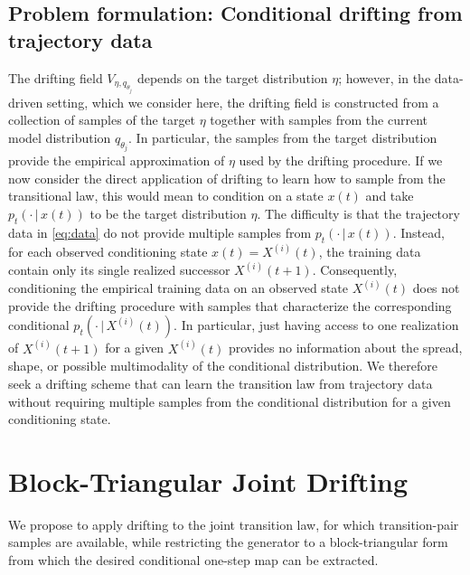 \documentclass[10pt,a4paper]{amsart}
\begin{document}
\subsection{Problem formulation: Conditional drifting from trajectory data}
The drifting field $V_{\eta,q_{\theta_j}}$ depends on the target distribution
$\eta$; however, in the data-driven setting, which we consider here, 
the drifting field is constructed from a collection of samples of the target $\eta$ together with samples from the current model
distribution $q_{\theta_j}$. 
In particular, the samples from the target distribution provide the empirical approximation of
$\eta$ used by the drifting procedure.
If we now consider the direct application
of drifting to learn how to sample from the transitional law, this would mean to condition on a state $x(t)$ and take $p_t(\cdot\,|\,x(t))$ to be the target distribution $\eta$.  
The difficulty is that the trajectory data in \eqref{eq:data} do not provide multiple samples from $p_t(\cdot \,|\, x(t))$. Instead, for each observed conditioning state $ x(t) = X^{(i)}(t)$, the training data contain only its single realized successor $X^{(i)}(t+1)$.
Consequently, conditioning the empirical training data on an observed
state $X^{(i)}(t)$ does not provide the drifting procedure with samples that
characterize the corresponding  conditional
$p_t(\cdot\,|\,X^{(i)}(t))$. In particular, just having access to one realization of $X^{(i)}(t + 1)$ for a given $X^{(i)}(t)$
provides no information about the spread, shape, or possible multimodality
of the conditional distribution.
We therefore seek a drifting scheme that can learn the transition law from trajectory data without requiring multiple  samples from the conditional distribution for a given conditioning state.




\section{Block-Triangular Joint Drifting}
We propose to apply drifting to the joint transition law, for which transition-pair samples are available, while restricting the generator to a block-triangular form from which the desired conditional one-step map can be extracted. 
\end{document}
